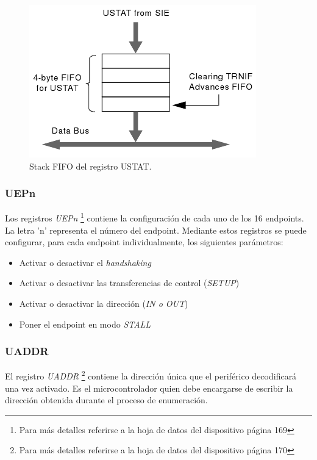 \begin{figure}[htp]
\centering
\includegraphics[scale=0.6]{./img/ustat_fifo.png}
\caption{Stack FIFO del registro USTAT.}
\label{fig:ustat_fifo}
\end{figure}

\subsubsection{UEPn}
Los registros \emph{UEPn} \footnote{Para m\'as detalles referirse a la hoja de
datos del dispositivo p\'agina 169} contiene la
configuraci\'on de cada uno de los 16 endpoints. La letra 'n' representa el
n\'umero del endpoint.
Mediante estos registros se puede configurar, para cada endpoint
individualmente, los siguientes par\'ametros:

\begin{itemize}
 \item Activar o desactivar el \emph{handshaking}

 \item Activar o desactivar las transferencias de control (\emph{SETUP})

 \item Activar o desactivar la direcci\'on (\emph{IN o OUT})

 \item Poner el endpoint en modo \emph{STALL}
\end{itemize}


\subsubsection{UADDR}
El registro \emph{UADDR} \footnote{Para m\'as detalles referirse a la hoja de
datos del dispositivo p\'agina 170} contiene la
direcci\'on \'unica que el perif\'erico decodificar\'a una vez activado. Es el
microcontrolador quien debe encargarse de escribir la direcci\'on obtenida
durante el proceso de enumeraci\'on.

